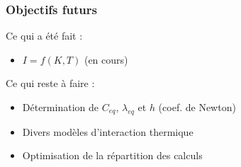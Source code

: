 \documentclass[a4paper,11pt]{beamer}
\begin{document}
\begin{frame}
    \frametitle{Objectifs futurs}

    Ce qui a été fait :
    \begin{itemize}
        \item $I = f(K, T)$ (en cours)
    \end{itemize}

    Ce qui reste à faire :
    \begin{itemize}
        \item Détermination de $C_{eq}$, $\lambda_{eq}$ et $h$ (coef. de Newton)
        \item Divers modèles d'interaction thermique %
        \item Optimisation de la répartition des calculs
    \end{itemize}
\end{frame}

\end{document}
